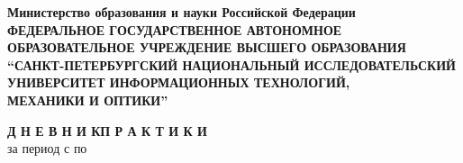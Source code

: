 \documentclass[pta]{../../../../scs-iam}
\begin{document}

\thispagestyle{empty}

\begin{center}
  {
    \bfseries
    {
      \subnormal
      Министерство образования и науки Российской Федерации
    } \\[-0.5em]
    {
      \scriptsize
      ФЕДЕРАЛЬНОЕ ГОСУДАРСТВЕННОЕ АВТОНОМНОЕ ОБРАЗОВАТЕЛЬНОЕ УЧРЕЖДЕНИЕ ВЫСШЕГО ОБРАЗОВАНИЯ
    } \\[-0.25em]
    {
      \subnormal
      “САНКТ-ПЕТЕРБУРГСКИЙ НАЦИОНАЛЬНЫЙ ИССЛЕДОВАТЕЛЬСКИЙ \\[-0.5em]
      УНИВЕРСИТЕТ ИНФОРМАЦИОННЫХ ТЕХНОЛОГИЙ, \\[-0.75em]
      МЕХАНИКИ И ОПТИКИ”
    } \\[1em]
  }
\end{center}

\small

\begin{center}
  {
    \normalsize
    \textbf{Д Н Е В Н И К\quad П Р А К Т И К И}
  } \\[-0.25em]
  за период с \underline{} по \underline{}
\end{center}
\end{document}
